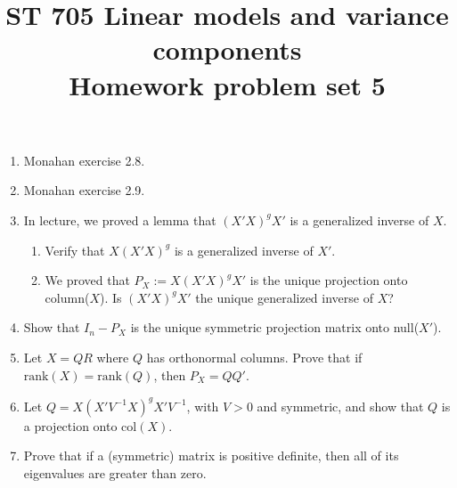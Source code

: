 \documentclass[11pt]{article}
\title{ST 705 Linear models and variance components \\ 
        Homework problem set 5}
\begin{document}
\maketitle

\begin{enumerate}

\item Monahan exercise 2.8.

\item Monahan exercise 2.9.

\item In lecture, we proved a lemma that $(X'X)^{g}X'$ is a generalized inverse of $X$.
\begin{enumerate}
\item Verify that $X(X'X)^{g}$ is a generalized inverse of $X'$.
\item We proved that $P_{X} := X(X'X)^{g}X'$ is the unique projection onto column($X$).  Is $(X'X)^{g}X'$ the unique generalized inverse of $X$?  
\end{enumerate}

\item Show that $I_{n} - P_{X}$ is the unique symmetric projection matrix onto null($X'$).

\item Let $X = QR$ where $Q$ has orthonormal columns.  Prove that if $\text{rank}(X) = \text{rank}(Q)$, then $P_{X} = QQ'$.

\item Let $Q = X(X'V^{-1}X)^{g}X'V^{-1}$, with $V > 0$ and symmetric, and show that $Q$ is a projection onto col$(X)$.

\item Prove that if a (symmetric) matrix is positive definite, then all of its eigenvalues are greater than zero.

\end{enumerate}
\end{document}
